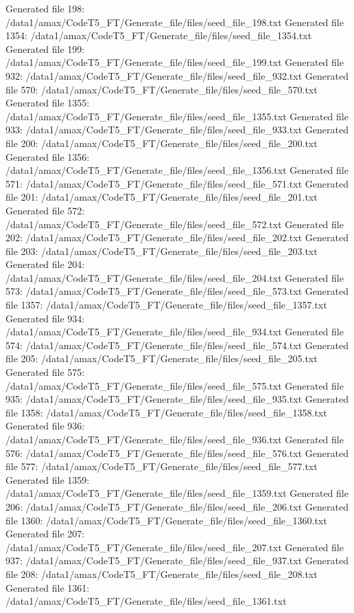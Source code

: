 Generated file 198: /data1/amax/CodeT5_FT/Generate_file/files/seed_file_198.txt
Generated file 1354: /data1/amax/CodeT5_FT/Generate_file/files/seed_file_1354.txt
Generated file 199: /data1/amax/CodeT5_FT/Generate_file/files/seed_file_199.txt
Generated file 932: /data1/amax/CodeT5_FT/Generate_file/files/seed_file_932.txt
Generated file 570: /data1/amax/CodeT5_FT/Generate_file/files/seed_file_570.txt
Generated file 1355: /data1/amax/CodeT5_FT/Generate_file/files/seed_file_1355.txt
Generated file 933: /data1/amax/CodeT5_FT/Generate_file/files/seed_file_933.txt
Generated file 200: /data1/amax/CodeT5_FT/Generate_file/files/seed_file_200.txt
Generated file 1356: /data1/amax/CodeT5_FT/Generate_file/files/seed_file_1356.txt
Generated file 571: /data1/amax/CodeT5_FT/Generate_file/files/seed_file_571.txt
Generated file 201: /data1/amax/CodeT5_FT/Generate_file/files/seed_file_201.txt
Generated file 572: /data1/amax/CodeT5_FT/Generate_file/files/seed_file_572.txt
Generated file 202: /data1/amax/CodeT5_FT/Generate_file/files/seed_file_202.txt
Generated file 203: /data1/amax/CodeT5_FT/Generate_file/files/seed_file_203.txt
Generated file 204: /data1/amax/CodeT5_FT/Generate_file/files/seed_file_204.txt
Generated file 573: /data1/amax/CodeT5_FT/Generate_file/files/seed_file_573.txt
Generated file 1357: /data1/amax/CodeT5_FT/Generate_file/files/seed_file_1357.txt
Generated file 934: /data1/amax/CodeT5_FT/Generate_file/files/seed_file_934.txt
Generated file 574: /data1/amax/CodeT5_FT/Generate_file/files/seed_file_574.txt
Generated file 205: /data1/amax/CodeT5_FT/Generate_file/files/seed_file_205.txt
Generated file 575: /data1/amax/CodeT5_FT/Generate_file/files/seed_file_575.txt
Generated file 935: /data1/amax/CodeT5_FT/Generate_file/files/seed_file_935.txt
Generated file 1358: /data1/amax/CodeT5_FT/Generate_file/files/seed_file_1358.txt
Generated file 936: /data1/amax/CodeT5_FT/Generate_file/files/seed_file_936.txt
Generated file 576: /data1/amax/CodeT5_FT/Generate_file/files/seed_file_576.txt
Generated file 577: /data1/amax/CodeT5_FT/Generate_file/files/seed_file_577.txt
Generated file 1359: /data1/amax/CodeT5_FT/Generate_file/files/seed_file_1359.txt
Generated file 206: /data1/amax/CodeT5_FT/Generate_file/files/seed_file_206.txt
Generated file 1360: /data1/amax/CodeT5_FT/Generate_file/files/seed_file_1360.txt
Generated file 207: /data1/amax/CodeT5_FT/Generate_file/files/seed_file_207.txt
Generated file 937: /data1/amax/CodeT5_FT/Generate_file/files/seed_file_937.txt
Generated file 208: /data1/amax/CodeT5_FT/Generate_file/files/seed_file_208.txt
Generated file 1361: /data1/amax/CodeT5_FT/Generate_file/files/seed_file_1361.txt
